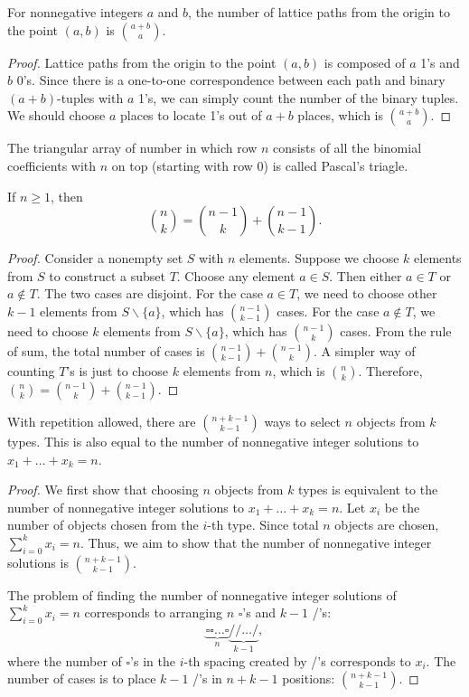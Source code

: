 \documentclass[../main.tex]{subfiles}
\begin{document}
\begin{prop}
    For nonnegative integers $a$ and $b$, the number of lattice paths from the origin to the point $(a, b)$ is $a + b \choose a$.
\end{prop}
\begin{proof}
    Lattice paths from the origin to the point $(a, b)$ is composed of $a$ 1's and $b$ 0's.
    Since there is a one-to-one correspondence between each path and binary $(a + b)$-tuples with $a$ 1's, we can simply count the number of the binary tuples.
    We should choose $a$ places to locate 1's out of $a + b$ places, which is $a + b \choose a$.
\end{proof}

The triangular array of number in which row $n$ consists of all the binomial coefficients with $n$ on top (starting with row 0) is called \textsf{Pascal's triagle}.
\begin{lem}  \label{lem:pascal}
    If $n \geq 1$, then
    \[
        {n \choose k} = {n - 1 \choose k} + {n - 1 \choose k - 1}.
    \]
\end{lem}
\begin{proof}
    Consider a nonempty set $S$ with $n$ elements.
    Suppose we choose $k$ elements from $S$ to construct a subset $T$.
    Choose any element $a \in S$.
    Then either $a \in T$ or $a \notin T$.
    The two cases are disjoint.
    For the case $a \in T$, we need to choose other $k - 1$ elements from $S \backslash \{a\}$, which has $n - 1 \choose k - 1$ cases.
    For the case $a \notin T$, we need to choose $k$ elements from $S \backslash \{a\}$, which has $n - 1 \choose k$ cases.
    From the rule of sum, the total number of cases is ${n - 1 \choose k - 1} + {n - 1 \choose k}$.
    A simpler way of counting $T$'s is just to choose $k$ elements from $n$, which is $n \choose k$.
    Therefore, ${n \choose k} = {n - 1 \choose k} + {n - 1 \choose k - 1}$.
\end{proof}

\begin{thm} 
    With repetition allowed, there are $n + k - 1 \choose k - 1$ ways to select $n$ objects from $k$ types.
    This is also equal to the number of nonnegative integer solutions to $x_1 + \dots + x_k = n$.
\end{thm}
\begin{proof}
    We first show that choosing $n$ objects from $k$ types is equivalent to the number of nonnegative integer solutions to $x_1 + \dots + x_k = n$.
    Let $x_i$ be the number of objects chosen from the $i$-th type.
    Since total $n$ objects are chosen, $\sum_{i = 0}^k x_i = n$.
    Thus, we aim to show that the number of nonnegative integer solutions is $n + k - 1 \choose k - 1$.

    The problem of finding the number of nonnegative integer solutions of $\sum_{i=0}^k x_i = n$ corresponds to arranging $n$ $\square$'s and $k - 1$ /'s:
    \[
        \underbrace{\square \square \dots \square}_n \underbrace{/ / \dots /}_{k-1},
    \]
    where the number of $\square$'s in the $i$-th spacing created by /'s corresponds to $x_i$.
    The number of cases is to place $k - 1$ /'s in $n + k - 1$ positions: $n + k - 1 \choose k - 1$.
\end{proof}
\end{document}
